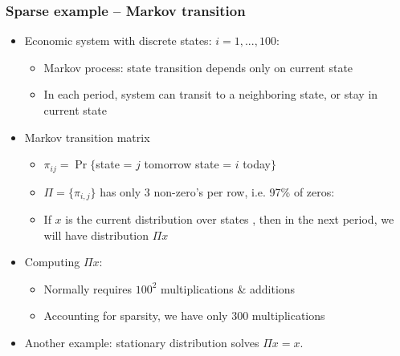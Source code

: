 \documentclass[bigger]{beamer}
\begin{document}
\begin{frame}%

\frametitle{Sparse example -- Markov transition}

\begin{itemize}
\item Economic system with discrete states: $i=1,...,100$:

\begin{itemize}
\item Markov process: state transition depends only on current state

\item In each period, system can transit to a neighboring state, \newline
or stay in current state
\end{itemize}

\item Markov transition matrix

\begin{itemize}
\item $\pi _{ij}=\Pr \{$state = $j$ tomorrow \TEXTsymbol{\vert} state = $i$
today$\}$

\item $\Pi =\{\pi _{i,j}\}$ has only 3 non-zero's per row, i.e. 97\% of
zeros:

\item If $x$ is the current distribution over states , \newline
then in the next period, we will have distribution $\Pi x$
\end{itemize}

\item Computing $\Pi x$:

\begin{itemize}
\item Normally requires $100^{2}$ multiplications \& additions

\item Accounting for sparsity, we have only 300 multiplications
\end{itemize}

\item Another example: stationary distribution solves $\Pi x=x$.
\end{itemize}


\end{frame}%
\end{document}

